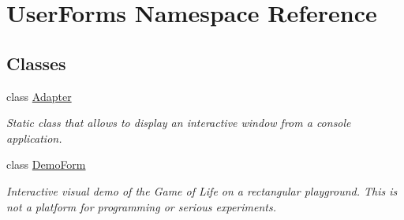\hypertarget{namespace_user_forms}{}\section{User\+Forms Namespace Reference}
\label{namespace_user_forms}
\subsection*{Classes}
\begin{DoxyCompactItemize}
\item 
class \hyperlink{class_user_forms_1_1_adapter}{Adapter}
\begin{DoxyCompactList}\small\item\em Static class that allows to display an interactive window from a console application. \end{DoxyCompactList}\item 
class \hyperlink{class_user_forms_1_1_demo_form}{Demo\+Form}
\begin{DoxyCompactList}\small\item\em Interactive visual demo of the Game of Life on a rectangular playground. This is not a platform for programming or serious experiments. \end{DoxyCompactList}\end{DoxyCompactItemize}
